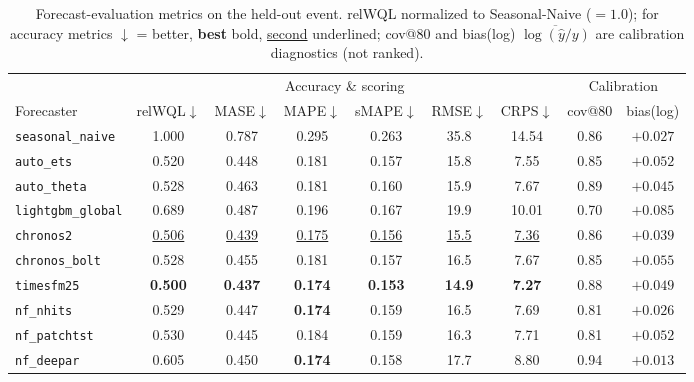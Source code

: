 \documentclass{article}
\begin{document}
\begin{table}[H]
  \caption{Forecast-evaluation metrics on the held-out event. relWQL normalized to Seasonal-Naive ($=1.0$); for accuracy metrics $\downarrow$ = better, \textbf{best} bold, \underline{second} underlined; cov@80 and bias(log) $\overline{\log(\hat{y}/y)}$ are calibration diagnostics (not ranked).}
  \label{tab:quality}
  \centering\footnotesize
  \begin{tabular}{lcccccccc}
    \toprule
    & \multicolumn{6}{c}{Accuracy \& scoring} & \multicolumn{2}{c}{Calibration} \\
    \cmidrule(lr){2-7}\cmidrule(lr){8-9}
    Forecaster & relWQL$\downarrow$ & MASE$\downarrow$ & MAPE$\downarrow$ & sMAPE$\downarrow$ & RMSE$\downarrow$ & CRPS$\downarrow$ & cov@80 & bias(log) \\
    \midrule
    \texttt{seasonal\_naive}  & 1.000 & 0.787 & 0.295 & 0.263 & 35.8 & 14.54 & 0.86 & $+0.027$ \\
    \texttt{auto\_ets}        & 0.520 & 0.448 & 0.181 & 0.157 & 15.8 & 7.55  & 0.85 & $+0.052$ \\
    \texttt{auto\_theta}      & 0.528 & 0.463 & 0.181 & 0.160 & 15.9 & 7.67  & 0.89 & $+0.045$ \\
    \texttt{lightgbm\_global} & 0.689 & 0.487 & 0.196 & 0.167 & 19.9 & 10.01 & 0.70 & $+0.085$ \\
    \texttt{chronos2}         & \underline{0.506} & \underline{0.439} & \underline{0.175} & \underline{0.156} & \underline{15.5} & \underline{7.36}  & 0.86 & $+0.039$ \\
    \texttt{chronos\_bolt}    & 0.528 & 0.455 & 0.181 & 0.157 & 16.5 & 7.67  & 0.85 & $+0.055$ \\
    \texttt{timesfm25}        & \textbf{0.500} & \textbf{0.437} & \textbf{0.174} & \textbf{0.153} & \textbf{14.9} & \textbf{7.27}  & 0.88 & $+0.049$ \\
    \texttt{nf\_nhits}        & 0.529 & 0.447 & \textbf{0.174} & 0.159 & 16.5 & 7.69  & 0.81 & $+0.026$ \\
    \texttt{nf\_patchtst}     & 0.530 & 0.445 & 0.184 & 0.159 & 16.3 & 7.71  & 0.81 & $+0.052$ \\
    \texttt{nf\_deepar}       & 0.605 & 0.450 & \textbf{0.174} & 0.158 & 17.7 & 8.80  & 0.94 & $+0.013$ \\
    \bottomrule
  \end{tabular}
\end{table}





\end{document}
